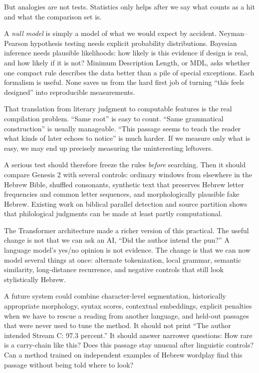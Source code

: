 But analogies are not tests. Statistics only helps after we say what counts as a hit and what the comparison set is.

A \emph{null model} is simply a model of what we would expect by accident. Neyman--Pearson hypothesis testing needs explicit probability distributions.\cite{NeymanPearson1933} Bayesian inference needs plausible likelihoods: how likely is this evidence if design is real, and how likely if it is not?\cite{Jaynes2003} Minimum Description Length, or MDL, asks whether one compact rule describes the data better than a pile of special exceptions.\cite{Rissanen1978} Each formalism is useful. None saves us from the hard first job of turning ``this feels designed'' into reproducible measurements.

That translation from literary judgment to computable features is the real compilation problem. ``Same root'' is easy to count. ``Same grammatical construction'' is usually manageable. ``This passage seems to teach the reader what kinds of later echoes to notice'' is much harder. If we measure only what is easy, we may end up precisely measuring the uninteresting leftovers.

A serious test should therefore freeze the rules \emph{before} searching. Then it should compare Genesis 2 with several controls: ordinary windows from elsewhere in the Hebrew Bible, shuffled consonants, synthetic text that preserves Hebrew letter frequencies and common letter sequences, and morphologically plausible fake Hebrew. Existing work on biblical parallel detection and source partition shows that philological judgments can be made at least partly computational.\cite{NaaijerRoorda2016,YoffeEtAl2023}

The Transformer architecture made a richer version of this practical.\cite{VaswaniEtAl2017} The useful change is not that we can ask an AI, ``Did the author intend the pun?'' A language model's yes/no opinion is not evidence. The change is that we can now model several things at once: alternate tokenization, local grammar, semantic similarity, long-distance recurrence, and negative controls that still look stylistically Hebrew.

A future system could combine character-level segmentation, historically appropriate morphology, syntax scores, contextual embeddings, explicit penalties when we have to rescue a reading from another language, and held-out passages that were never used to tune the method. It should not print ``The author intended Stream C: 97.3 percent.'' It should answer narrower questions: How rare is a carry-chain like this? Does this passage stay unusual after linguistic controls? Can a method trained on independent examples of Hebrew wordplay find this passage without being told where to look?

